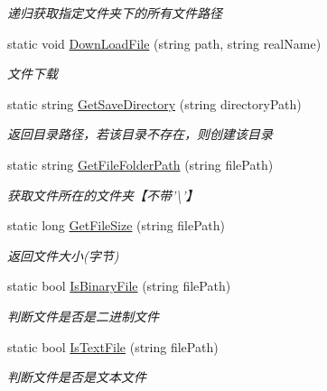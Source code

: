 \begin{DoxyCompactItemize}
\begin{DoxyCompactList}\small\item\em 递归获取指定文件夹下的所有文件路径 \end{DoxyCompactList}\item 
static void \hyperlink{class_x_c_l_net_tools_1_1_file_handler_1_1_com_file_a88a411e0efbbb5117f62ae15734b5a4b}{Down\-Load\-File} (string path, string real\-Name)
\begin{DoxyCompactList}\small\item\em 文件下载 \end{DoxyCompactList}\item 
static string \hyperlink{class_x_c_l_net_tools_1_1_file_handler_1_1_com_file_a7fd47f5dd58f607c4fad3bb596f2d7b6}{Get\-Save\-Directory} (string directory\-Path)
\begin{DoxyCompactList}\small\item\em 返回目录路径，若该目录不存在，则创建该目录 \end{DoxyCompactList}\item 
static string \hyperlink{class_x_c_l_net_tools_1_1_file_handler_1_1_com_file_a54bcd222d9060ea6ee9d64264caf9939}{Get\-File\-Folder\-Path} (string file\-Path)
\begin{DoxyCompactList}\small\item\em 获取文件所在的文件夹【不带'\textbackslash{}'】 \end{DoxyCompactList}\item 
static long \hyperlink{class_x_c_l_net_tools_1_1_file_handler_1_1_com_file_a14816af3acf91a20ded5325a889f8341}{Get\-File\-Size} (string file\-Path)
\begin{DoxyCompactList}\small\item\em 返回文件大小(字节) \end{DoxyCompactList}\item 
static bool \hyperlink{class_x_c_l_net_tools_1_1_file_handler_1_1_com_file_a9e413978309f59720a38228ad9c1aaa2}{Is\-Binary\-File} (string file\-Path)
\begin{DoxyCompactList}\small\item\em 判断文件是否是二进制文件 \end{DoxyCompactList}\item 
static bool \hyperlink{class_x_c_l_net_tools_1_1_file_handler_1_1_com_file_afddfff3c4a196399bc033df2b017b16c}{Is\-Text\-File} (string file\-Path)
\begin{DoxyCompactList}\small\item\em 判断文件是否是文本文件 \end{DoxyCompactList}\item 

\end{DoxyCompactItemize}
